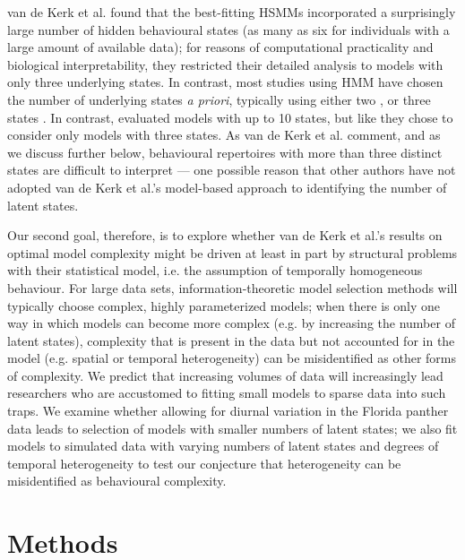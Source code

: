 \documentclass{bmcart}
\begin{document}
van de Kerk et al.\cite{kerk2015hidden} found that the best-fitting HSMMs
incorporated a surprisingly large number of hidden
behavioural states (as many as six for individuals with a large amount
of available data); for reasons of computational 
practicality and biological interpretability, they restricted their
detailed analysis to models with only three underlying states.  In
contrast, most studies using HMM have chosen the
number of underlying states \emph{a priori}, typically using either two
\cite{schliehe-diecks_application_2012,mckellar_using_2014,langrock_flexible_2012,fryxell_multiple_2008}, or three states
\cite{dean2012behavioural,morales_extracting_2004,franke_prediction_2006}. 
In contrast, \cite{dean_behavioural_2013} evaluated models with up to 10
states, but like \cite{kerk2015hidden} they chose to consider only 
models with three states. 
As van de Kerk et al. \cite{kerk2015hidden} comment, and as
we discuss further below, behavioural
repertoires with more than three distinct states are difficult to
interpret --- one possible reason that other authors have not adopted
van de Kerk et al.'s model-based approach to
identifying the number of latent states.

Our second goal, therefore, is to explore whether
van de Kerk et al.'s results on optimal
model complexity might be driven at
least in part by structural problems with their statistical
model, i.e. the
assumption of temporally homogeneous behaviour.  For large data sets, 
information-theoretic model selection methods will
typically choose complex, highly parameterized models; when there is
only one way in which models can become more complex (e.g. by
increasing the number of latent states), complexity that is
present in the data but not accounted for in the model (e.g. spatial
or temporal heterogeneity) can be misidentified as other forms of
complexity.  We predict that increasing volumes of data will
increasingly lead researchers who are accustomed to fitting 
small models to sparse data into such traps.  We examine whether
allowing for diurnal variation in the Florida panther data leads to
selection of models with smaller numbers of latent states; we also
fit models to simulated data with varying numbers of latent states
and degrees of temporal heterogeneity to test our conjecture that
heterogeneity can be misidentified as behavioural complexity.

\section*{Methods}
\end{document}
